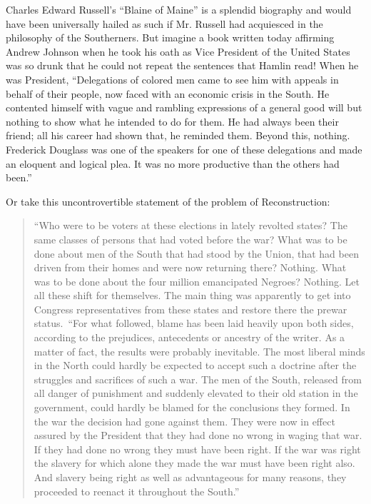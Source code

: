 \documentclass[letterpaper,10pt,english]{jupyterBook}
\begin{document}
\sphinxAtStartPar
Charles Edward Russell’s “Blaine of Maine” is a splendid biography and would have been universally hailed as such if Mr. Russell had acquiesced in the philosophy of the Southerners. But imagine a book written today affirming Andrew Johnson when he took his oath as Vice President of the United States was so drunk that he could not repeat the sentences that Hamlin read! When he was President, “Delegations of colored men came to see him with appeals in behalf of their people, now faced with an economic crisis in the South. He contented himself with vague and rambling expressions of a general good will but nothing to show what he intended to do for them. He had always been their friend; all his career had shown that, he reminded them. Beyond this, nothing. Frederick Douglass was one of the speakers for one of these delegations and made an eloquent and logical plea. It was no more productive than the others had been.”

\sphinxAtStartPar
Or take this uncontrovertible statement of the problem of Reconstruction:
\begin{quote}

\sphinxAtStartPar
“Who were to be voters at these elections in lately revolted states? The same classes of persons that had voted before the war? What was to be done about men of the South that had stood by the Union, that had been driven from their homes and were now returning there? Nothing. What was to be done about the four million emancipated Negroes? Nothing. Let all these shift for themselves. The main thing was apparently to get into Congress representatives from these states and restore there the pre\sphinxhyphen{}war status. “For what followed, blame has been laid heavily upon both sides, according to the prejudices, antecedents or ancestry of the writer. As a matter of fact, the results were probably inevitable. The most liberal minds in the North could hardly be expected to accept such a doctrine after the struggles and sacrifices of such a war. The men of the South, released from all danger of punishment and suddenly elevated to their old station in the government, could hardly be blamed for the conclusions they formed. In the war the decision had gone against them. They were now in effect assured by the President that they had done no wrong in waging that war. If they had done no wrong they must have been right. If the war was right the slavery for which alone they made the war must have been right also. And slavery being right as well as advantageous for many reasons, they proceeded to reenact it throughout the South.”
\end{quote}
\end{document}
